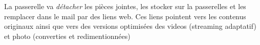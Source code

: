\documentclass[portrait,final,a0paper]{baposter}
\begin{document}
\begin{poster}
{\begin{multicols}{2}
			La passerelle va \textit{détacher} les pièces jointes, les stocker sur la passerelles et les remplacer dans le mail par des liens web. Ces liens pointent vers les contenus originaux ainsi que vers des versions optimisées des videos (streaming adaptatif) et photo (converties et redimentionnées)
	\end{multicols}
    }
 
 
\end{poster}
\end{document}

